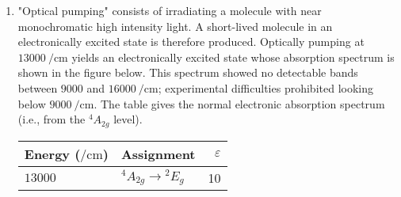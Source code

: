 \documentclass[../psets.tex]{subfiles}
\begin{document}
\begin{enumerate}[label={\Roman*)}]
\begin{proof}[Answer]
        We will now consider the ${}^1A_{1g}\to{}^1T_{2g}$ transition. Using the same method as before, we can determine that
        \begin{align*}
            \Gamma_\text{ev} &= A_{1g}+E_g+2T_{1u}+T_{2g}+T_{2u}\\
            \Gamma_2 &= T_{2g}\\
            \Gamma_\mu &= T_{1u}\\
            \Gamma_1 &= A_{1g}\\
            \Gamma_\text{gv} &= A_{1g}
        \end{align*}
        As before, the product of the right four terms is
        \begin{align*}
            \Gamma_2\otimes\Gamma_\mu\otimes\Gamma_1\otimes\Gamma_\text{gv} &= T_{2g}\otimes T_{1u}\otimes A_{1g}\otimes A_{1g}\\
            &= T_{2g}\otimes T_{1u}\\
            &= A_{2u}+E_u+T_{1u}+T_{2u}
        \end{align*}
        By Theorem 2, the direct product of the above and any of $A_{1g}$, $E_g$, and $T_{2g}$ does not contain the totally symmetric representation, but the direct product of the above and any of $T_{1u}$ and $T_{2u}$ does. Therefore, the ${}^1A_{1g}\to{}^1T_{2g}$ transition is vibronically allowed.
    \end{proof}
    \newpage
    \item "Optical pumping" consists of irradiating a molecule with near monochromatic high intensity light. A short-lived molecule in an electronically excited state is therefore produced. Optically pumping  at $\SI{13000}{\per\centi\meter}$ yields an electronically excited state whose absorption spectrum is shown in the figure below. This spectrum showed no detectable bands between $\num{9000}$ and $\SI{16000}{\per\centi\meter}$; experimental difficulties prohibited looking below $\SI{9000}{\per\centi\meter}$. The table gives the normal electronic absorption spectrum (i.e., from the ${}^4A_{2g}$ level).
    \begin{table}[h!]
        \centering
        \small
        \renewcommand{\arraystretch}{1.4}
        \begin{tabular}{llr}
            \hline
            Energy ($\si{\per\centi\meter}$) & Assignment & $\varepsilon$\\
            \hline
            $\num{13000}$ & ${}^4A_{2g}\to{}^2E_g$               & 10\\

\end{tabular}
\end{table}
\end{enumerate}
\end{document}
